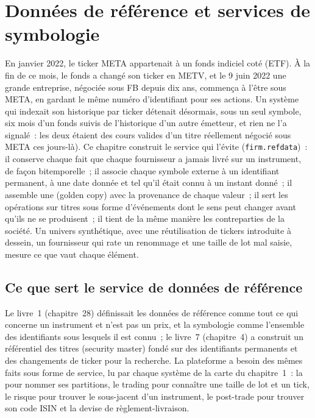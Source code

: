 \chapter{Données de référence et services de symbologie}\label{ch:pl:reference-data-and-symbology-services}

En janvier 2022, le ticker META appartenait à un fonds indiciel coté (ETF). À la fin de ce mois, le fonds a changé son ticker en
METV, et le 9 juin 2022 une grande entreprise, négociée sous FB depuis dix ans, commença à l'être sous META, en gardant le même
numéro d'identifiant pour ses actions. Un système qui indexait son historique par ticker détenait désormais, sous un seul symbole, six mois d'un fonds suivis de
l'historique d'un autre émetteur, et rien ne l'a signalé~: les deux étaient des cours valides d'un titre réellement négocié sous META
ces jours-là). Ce chapitre construit le service qui l'évite (\texttt{firm.refdata})~: il conserve chaque fait que chaque fournisseur a jamais livré
sur un instrument, de façon bitemporelle~; il associe chaque symbole externe à un identifiant permanent, à une date donnée et tel qu'il était connu à un
instant donné~; il assemble une  (golden copy) avec la provenance de chaque valeur~; il sert les opérations sur titres sous forme d'événements dont le sens peut changer
avant qu'ils ne se produisent~; il tient de la même manière les contreparties de la société. Un univers synthétique, avec une réutilisation de tickers introduite à dessein, un fournisseur
qui rate un renommage et une taille de lot mal saisie, mesure ce que vaut chaque élément.

\section{Ce que sert le service de données de référence}

Le livre~1 (chapitre~28) définissait les données de référence comme tout ce qui concerne un instrument et n'est pas un prix, et la symbologie comme
l'ensemble des identifiants sous lesquels il est connu~; le livre~7 (chapitre~4) a construit un référentiel des titres (security master) fondé sur des identifiants permanents et des
changements de ticker pour la recherche. La plateforme a besoin des mêmes faits sous forme de service, lu par chaque système de la carte du chapitre~1~: la  pour nommer ses partitions, le trading pour connaître une taille de lot et un tick, le risque pour trouver le sous-jacent d'un instrument, le post-trade pour trouver
son code ISIN et la devise de règlement-livraison.

